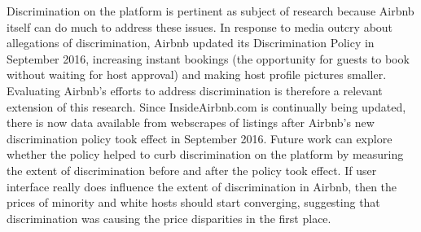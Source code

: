 \documentclass[11pt, oneside]{article}
\begin{document}
Discrimination on the platform is pertinent as subject of research because Airbnb itself can do much to address these issues. 
In response to media outcry about allegations of discrimination, Airbnb updated its Discrimination Policy in September 2016, increasing instant bookings (the opportunity for guests to book without waiting for host approval) and making host profile pictures smaller. Evaluating Airbnb's efforts to address discrimination is therefore a relevant extension of this research. Since InsideAirbnb.com is continually being updated, there is now data available from webscrapes of listings after Airbnb's new discrimination policy took effect in September 2016. Future work can explore whether the policy helped to curb discrimination on the platform by measuring the extent of discrimination before and after the policy took effect. If user interface really does influence the extent of discrimination in Airbnb, then the prices of minority and white hosts should start converging, suggesting that discrimination was causing the price disparities in the first place. 
\end{document}
